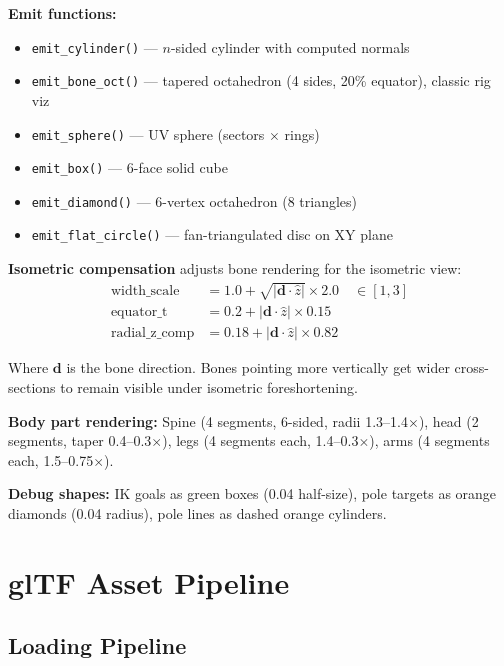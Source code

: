 \documentclass[11pt,a4paper]{article}
\begin{document}
\textbf{Emit functions:}
\begin{itemize}
  \item \texttt{emit\_cylinder()} --- $n$-sided cylinder with computed normals
  \item \texttt{emit\_bone\_oct()} --- tapered octahedron (4 sides, 20\% equator), classic rig viz
  \item \texttt{emit\_sphere()} --- UV sphere (sectors $\times$ rings)
  \item \texttt{emit\_box()} --- 6-face solid cube
  \item \texttt{emit\_diamond()} --- 6-vertex octahedron (8 triangles)
  \item \texttt{emit\_flat\_circle()} --- fan-triangulated disc on XY plane
\end{itemize}

\textbf{Isometric compensation} adjusts bone rendering for the isometric view:
\begin{align}
  \text{width\_scale} &= 1.0 + \sqrt{|\mathbf{d} \cdot \hat{z}|} \times 2.0 \quad \in [1, 3] \\
  \text{equator\_t} &= 0.2 + |\mathbf{d} \cdot \hat{z}| \times 0.15 \\
  \text{radial\_z\_comp} &= 0.18 + |\mathbf{d} \cdot \hat{z}| \times 0.82
\end{align}

Where $\mathbf{d}$ is the bone direction. Bones pointing more vertically get wider cross-sections to remain visible under isometric foreshortening.

\textbf{Body part rendering:} Spine (4 segments, 6-sided, radii 1.3--1.4$\times$), head (2 segments, taper 0.4--0.3$\times$), legs (4 segments each, 1.4--0.3$\times$), arms (4 segments each, 1.5--0.75$\times$).

\textbf{Debug shapes:} IK goals as green boxes (0.04 half-size), pole targets as orange diamonds (0.04 radius), pole lines as dashed orange cylinders.

\section{glTF Asset Pipeline}
\label{sec:gltf-pipeline}

\subsection{Loading Pipeline}
\end{document}
